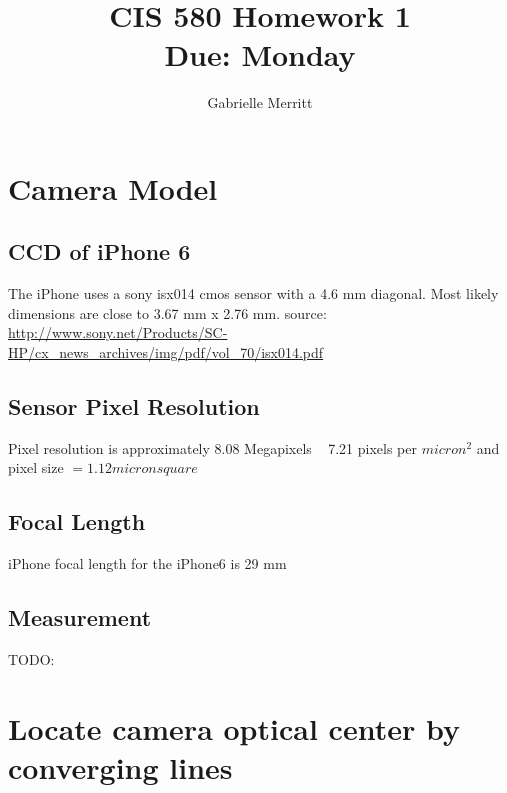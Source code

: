 \documentclass[11pt,english]{article}
\title{CIS 580 Homework 1 \\
Due: Monday}
\author{Gabrielle Merritt}
\date{}
\begin{document}
\maketitle
\section*{ Camera Model }
\subsection*{CCD of iPhone 6}
The iPhone uses a sony isx014 cmos sensor with a 4.6 mm diagonal. Most likely dimensions are close to 3.67 mm x  2.76 mm.
\linebreak source: \url{ http://www.sony.net/Products/SC-HP/cx_news_archives/img/pdf/vol_70/isx014.pdf}
\subsection*{Sensor Pixel Resolution}
Pixel resolution is approximately 8.08 Megapixels ~ 7.21 pixels per $micron^2$
and pixel size $ =1.12 micron square$ 
\subsection*{Focal Length}
iPhone focal length for the iPhone6 is 29 mm
\subsection*{Measurement} 
TODO: 
\section*{Locate camera optical center by converging lines}



	
\end{document}
